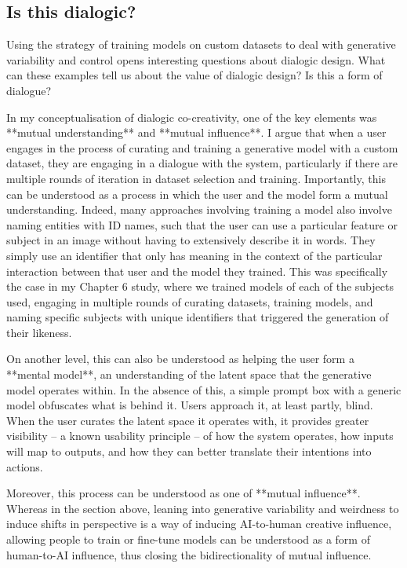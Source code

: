 \subsection{Is this dialogic?}

Using the strategy of training models on custom datasets to deal with generative variability and control opens interesting questions about dialogic design. What can these examples tell us about the value of dialogic design? Is this a form of dialogue?

In my conceptualisation of dialogic co-creativity, one of the key elements was **mutual understanding** and **mutual influence**. I argue that when a user engages in the process of curating and training a generative model with a custom dataset, they are engaging in a dialogue with the system, particularly if there are multiple rounds of iteration in dataset selection and training. Importantly, this can be understood as a process in which the user and the model form a mutual understanding. Indeed, many approaches involving training a model also involve naming entities with ID names, such that the user can use a particular feature or subject in an image without having to extensively describe it in words. They simply use an identifier that only has meaning in the context of the particular interaction between that user and the model they trained. This was specifically the case in my Chapter 6 study, where we trained models of each of the subjects used, engaging in multiple rounds of curating datasets, training models, and naming specific subjects with unique identifiers that triggered the generation of their likeness.

On another level, this can also be understood as helping the user form a **mental model**, an understanding of the latent space that the generative model operates within. In the absence of this, a simple prompt box with a generic model obfuscates what is behind it. Users approach it, at least partly, blind. When the user curates the latent space it operates with, it provides greater visibility -- a known usability principle -- of how the system operates, how inputs will map to outputs, and how they can better translate their intentions into actions.

Moreover, this process can be understood as one of **mutual influence**. Whereas in the section above, leaning into generative variability and weirdness to induce shifts in perspective is a way of inducing AI-to-human creative influence, allowing people to train or fine-tune models can be understood as a form of human-to-AI influence, thus closing the bidirectionality of mutual influence.

